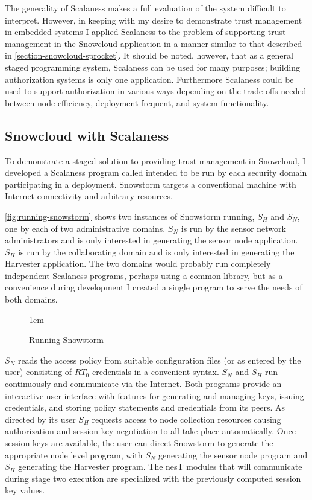 The generality of Scalaness makes a full evaluation of the system difficult to interpret.
However, in keeping with my desire to demonstrate trust management in embedded systems I applied
Scalaness to the problem of supporting trust management in the Snowcloud application in a manner
similar to that described in \autoref{section-snowcloud-sprocket}. It should be noted, however,
that as a general staged programming system, Scalaness can be used for many purposes; building
authorization systems is only one application. Furthermore Scalaness could be used to support
authorization in various ways depending on the trade offs needed between node efficiency,
deployment frequent, and system functionality.

\subsection{Snowcloud with Scalaness}

To demonstrate a staged solution to providing trust management in Snowcloud, I developed a
Scalaness program called  intended to be run by each security domain
participating in a deployment. Snowstorm targets a conventional machine with Internet
connectivity and arbitrary resources.

\autoref{fig:running-snowstorm} shows two instances of Snowstorm running, $S_H$ and $S_N$, one
by each of two administrative domains. $S_N$ is run by the sensor network administrators and is
only interested in generating the sensor node application. $S_H$ is run by the collaborating
domain and is only interested in generating the Harvester application. The two domains would
probably run completely independent Scalaness programs, perhaps using a common library, but as a
convenience during development I created a single program to serve the needs of both domains.

\begin{figure}[t]
  
  \centerline{\raise 1em\box\graph}
  \caption{Running Snowstorm}
  \label{fig:running-snowstorm}
\end{figure}

$S_N$ reads the access policy from suitable configuration files (or as entered by the user)
consisting of $RT_0$ credentials in a convenient syntax. $S_N$ and $S_H$ run continuously and
communicate via the Internet. Both programs provide an interactive user interface with features
for generating and managing keys, issuing credentials, and storing policy statements and
credentials from its peers. As directed by its user $S_H$ requests access to node collection
resources causing authorization and session key negotiation to all take place automatically.
Once session keys are available, the user can direct Snowstorm to generate the appropriate node
level program, with $S_N$ generating the sensor node program and $S_H$ generating the Harvester
program. The nesT modules that will communicate during stage two execution are specialized with
the previously computed session key values.

